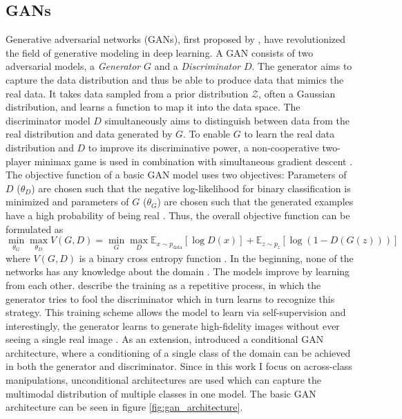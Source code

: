 \subsection{GANs}\label{sec:gans}
Generative adversarial networks (GANs), first proposed by \cite{goodfellow2014generative}, have revolutionized the field of generative modeling in deep learning. A GAN consists of two adversarial models, a \textit{Generator} $G$ and a \textit{Discriminator} $D$. The generator aims to capture the data distribution and thus be able to produce data that mimics the real data. It takes data sampled from a prior distribution $\mathcal{Z}$, often a Gaussian distribution, and learns a function to map it into the data space. The discriminator model $D$ simultaneously aims to distinguish between data from the real distribution and data generated by $G$. To enable $G$ to learn the real data distribution and $D$ to improve its discriminative power, a non-cooperative two-player minimax game is used in combination with simultaneous gradient descent \citep[p.5]{saxena2021generative}. The objective function of a basic GAN model uses two objectives: Parameters of $D$ ($\theta_D$) are chosen such that the negative log-likelihood for binary classification is minimized and parameters of $G$ ($\theta_G$) are chosen such that the generated examples have a high probability of being real \citep[p.6]{saxena2021generative}. Thus, the overall objective function can be formulated as
\begin{equation}
\label{eq:basic_gan_loss}
\min_{\theta_G} \max_{\theta_D} V(G, D) = \min_G \max_D \mathbb{E}_{x \sim p_{\text{data}}} [\log D(x)] + \mathbb{E}_{z \sim p_z} [\log (1 - D(G(z)))]
\end{equation}
 where $V(G,D)$ is a binary cross entropy function \citep[p.6]{saxena2021generative}. In the beginning, none of the networks has any knowledge about the domain \citep[p.2]{bermano2022state}. The models improve by learning from each other. \cite{bermano2022state} describe the training as a repetitive process, in which the generator tries to fool the discriminator which in turn learns to recognize this strategy. This training scheme allows the model to learn via self-supervision and interestingly, the generator learns to generate high-fidelity images without ever seeing a single real image \citep[p.2]{bermano2022state}. As an extension, \cite{mirza2014conditional} introduced a conditional GAN architecture, where a conditioning of a single class of the domain can be achieved in both the generator and discriminator. Since in this work I focus on across-class manipulations, unconditional architectures are used which can capture the multimodal distribution of multiple classes in one model. The basic GAN architecture can be seen in figure \ref{fig:gan_architecture}.
 
